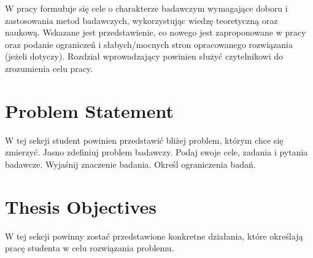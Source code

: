 \label{chapter:introduction}
W pracy formułuje się cele o charakterze badawczym wymagające doboru i zastosowania metod badawczych, wykorzystując wiedzę teoretyczną oraz naukową. Wskazane jest przedstawienie, co nowego jest zaproponowane w pracy oraz podanie ograniczeń i słabych/mocnych stron opracowanego rozwiązania (jeżeli dotyczy). Rozdział wprowadzający powinien służyć czytelnikowi do zrozumienia celu pracy.

\section{Problem Statement}
W tej sekcji student powinien przedstawić bliżej problem, którym chce się zmierzyć. Jasno zdefiniuj problem badawczy. Podaj swoje cele, zadania i pytania badawcze. Wyjaśnij znaczenie badania. Określ ograniczenia badań.


\section{Thesis Objectives}
W tej sekcji powinny zostać przedstawione konkretne działania, które określają pracę studenta w celu rozwiązania problemu.
